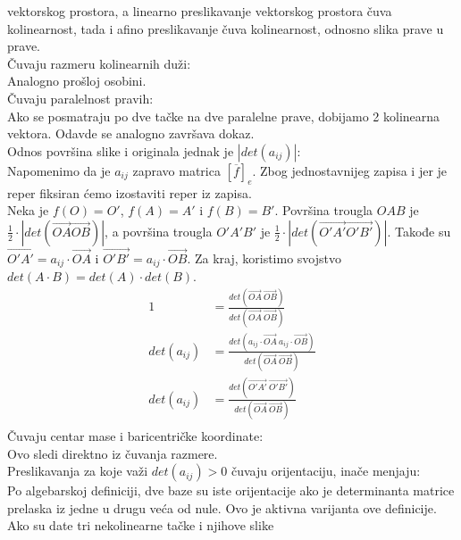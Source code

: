 \documentclass[12pt]{article}
\begin{document}
    vektorskog prostora, a linearno preslikavanje vektorskog prostora
    čuva kolinearnost, tada i afino preslikavanje čuva kolinearnost, odnosno slika prave u prave.\\
    Čuvaju razmeru kolinearnih duži:\\
    Analogno prošloj osobini.\\
    Čuvaju paralelnost pravih:\\
    Ako se posmatraju po dve tačke na dve paralelne prave,
    dobijamo 2 kolinearna vektora. Odavde se analogno završava dokaz.\\
    Odnos površina slike i originala jednak je $|det(a_{ij})|$:\\
    Napomenimo da je $a_{ij}$ zapravo matrica $[\overline{f}]_e$.
    Zbog jednostavnijeg zapisa i jer je reper fiksiran ćemo izostaviti reper iz zapisa.\\
    Neka je $f(O)=O'$, $f(A)=A'$ i $f(B)=B'$. Površina trougla
$OAB$ je $\frac{1}{2}\cdot |det(\overrightarrow{OA}\overrightarrow{OB})|$,
    a površina trougla $O'A'B'$ je $\frac{1}{2}\cdot |det(\overrightarrow{O'A'}\overrightarrow{O'B'})|$.
    Takođe su $\overrightarrow{O'A'}=a_{ij}\cdot \overrightarrow{OA}$ i $\overrightarrow{O'B'}=a_{ij}\cdot \overrightarrow{OB}$.
    Za kraj, koristimo svojstvo $det(A\cdot B)=det(A)\cdot det(B)$.
    \begin{align*}
        1           & =\frac{det(\overrightarrow{OA}\ \overrightarrow{OB})}{det(\overrightarrow{OA}\ \overrightarrow{OB})}                       \\
        det(a_{ij}) & =\frac{det(a_{ij}\cdot\overrightarrow{OA}\ a_{ij}\cdot\overrightarrow{OB})}{det(\overrightarrow{OA}\ \overrightarrow{OB})} \\
        det(a_{ij}) & =\frac{det(\overrightarrow{O'A'}\ \overrightarrow{O'B'})}{det(\overrightarrow{OA}\ \overrightarrow{OB})}                   \\
    \end{align*}
    Čuvaju centar mase i baricentričke koordinate:\\
    Ovo sledi direktno iz čuvanja razmere.\\
    Preslikavanja za koje važi $det(a_{ij})>0$ čuvaju orijentaciju,
    inače menjaju:\\
    Po algebarskoj definiciji, dve baze su iste orijentacije ako
    je determinanta matrice prelaska iz jedne u drugu veća od
    nule. Ovo je aktivna varijanta ove definicije.\\
    Ako su date tri nekolinearne tačke i njihove slike
\end{document}
